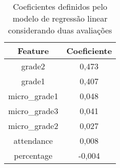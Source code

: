 \begin{table}[!htb]
    \centering
    \caption{Coeficientes definidos pelo modelo de regressão linear considerando duas avaliações}
    \begin{tabular}{@{}cc@{}}
        \hline
        \textbf{ Feature } & \textbf{ Coeficiente } \\ \hline
        grade2  & 0,473 \\
        grade1  & 0,407 \\
        micro\_grade1  & 0,048 \\
        micro\_grade3  & 0,041 \\
        micro\_grade2  & 0,027 \\
        attendance  & 0,008 \\
        percentage  & -0,004 \\ \bottomrule
    \end{tabular}
    \label{tab:coef-linear}
\end{table}